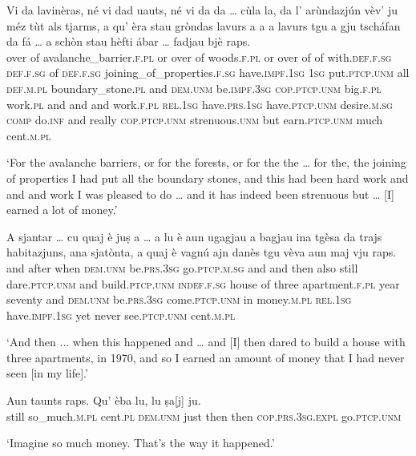 \medskip
\begin{linenumbers}
\gll    Vi da lavinèras, né vi dad uauts, né vi da da … cùla la, da l’ arùndazjún vèv’ ju méz tùt als tjarms, a qu’ èra stau gròndas lavurs a a a lavurs tgu a gju tscháfan da fá … a schòn stau hèfti ábar … fadjau bjè raps.\\
over of avalanche\_barrier.\textsc{f.pl} or over of woods.\textsc{f.pl} or over of of {} with.\textsc{def.f.sg} \textsc{def.f.sg} of \textsc{def.f.sg} joining\_of\_properties.\textsc{f.sg} have.\textsc{impf.1sg} \textsc{1sg} put.\textsc{ptcp.unm} all  \textsc{def.m.pl} boundary\_stone.\textsc{pl} and \textsc{dem.unm} be.\textsc{impf.3sg} \textsc{cop.ptcp.unm} big.\textsc{f.pl} work.\textsc{pl} and and and work.\textsc{f.pl} \textsc{rel.1sg} have.\textsc{prs.1sg} have.\textsc{ptcp.unm} desire.\textsc{m.sg} \textsc{comp} do.\textsc{inf} {} and really \textsc{cop.ptcp.unm} strenuous.\textsc{unm} but {} earn.\textsc{ptcp.unm} much cent.\textsc{m.pl}\\
\end{linenumbers}
\medskip
\glt `For the avalanche barriers, or for the forests, or for the the … for the, the joining of properties I had put all the boundary stones, and this had been  hard work and and and work I was pleased to do … and it has indeed been strenuous but … [I] earned a lot of money.'
\medskip

\begin{linenumbers}
\gll    A sjantar … cu quaj è juṣ a … a lu è aun ugagjau a bagjau ina tgèsa da trajs habitazjuns, ana sjatònta, a quaj è vagnú ajn danès tgu vèva aun maj vju raps.\\
and after {} when \textsc{dem.unm} be.\textsc{prs.3sg} go.\textsc{ptcp.m.sg} and {} and then also still dare.\textsc{ptcp.unm} and build.\textsc{ptcp.unm} \textsc{indef.f.sg} house of three apartment.\textsc{f.pl} year seventy and \textsc{dem.unm} be.\textsc{prs.3sg} come.\textsc{ptcp.unm} in money.\textsc{m.pl} \textsc{rel.1sg} have.\textsc{impf.1sg} yet never see.\textsc{ptcp.unm} cent.\textsc{m.pl}\\
\end{linenumbers}
\medskip
\glt `And then ... when this happened and … and [I] then dared to build a house with three apartments, in 1970, and so I earned an amount of money that I had never seen [in my life].'
\medskip

\begin{linenumbers}
\gll    Aun taunts raps. Qu’ èba lu, lu ṣa[j] ju.\\
still so\_much.\textsc{m.pl} cent.\textsc{pl} \textsc{dem.unm} just then then \textsc{cop.prs.3sg.expl} go.\textsc{ptcp.unm}\\
\end{linenumbers}
\medskip
\glt `Imagine so much money. That’s the way it happened.'
\medskip

